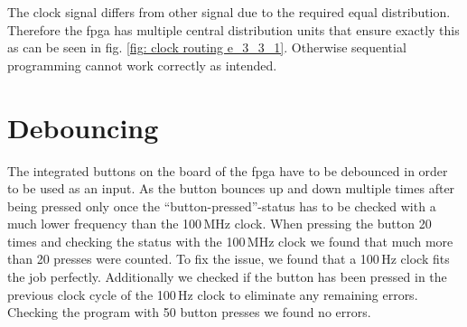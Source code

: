 The clock signal differs from other signal due to the required equal distribution. Therefore the \gls{fpga} has multiple central distribution units that ensure exactly this as can be seen in fig. \ref{fig: clock routing e_3_3_1}. Otherwise sequential programming cannot work correctly as intended.

\section{Debouncing}

The integrated buttons on the board of the \gls{fpga} have to be debounced in order to be used as an input. As the button bounces up and down multiple times after being pressed only once the ``button-pressed''-status has to be checked with a much lower frequency than the 100\,MHz clock. When pressing the button 20 times and checking the status with the 100\,MHz clock we found that much more than 20 presses were counted. To fix the issue, we found that a 100\,Hz clock fits the job perfectly. Additionally we checked if the button has been pressed in the previous clock cycle of the 100\,Hz clock to eliminate any remaining errors. Checking the program with 50 button presses we found no errors.

